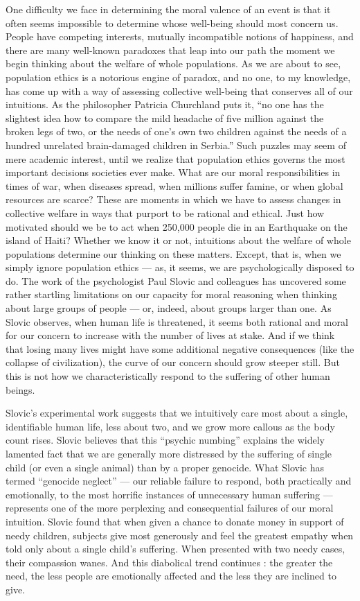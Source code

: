 \documentclass[a4paper,14pt]{extbook}
\begin{document}
One difficulty we face in determining the moral valence of an event is that it often seems impossible to determine whose well-being should most concern us.
People have competing interests, mutually incompatible notions of happiness, and there are many well-known paradoxes that leap into our path the moment we begin thinking about the welfare of whole populations.
As we are about to see, population ethics is a notorious engine of paradox, and no one, to my knowledge, has come up with a way of assessing collective well-being that conserves all of our intuitions.
As the philosopher Patricia Churchland puts it, ``no one has the slightest idea how to compare the mild headache of five million against the broken legs of two, or the needs of one's own two children against the needs of a hundred unrelated brain-damaged children in Serbia.''
Such puzzles may seem of mere academic interest, until we realize that population ethics governs the most important decisions societies ever make.
What are our moral responsibilities in times of war, when diseases spread, when millions suffer famine, or when global resources are scarce?
These are moments in which we have to assess changes in collective welfare in ways that purport to be rational and ethical.
Just how motivated should we be to act when 250,000 people die in an Earthquake on the island of Haiti?
Whether we know it or not, intuitions about the welfare of whole populations determine our thinking on these matters.
Except, that is, when we simply ignore population ethics --- as, it seems, we are psychologically disposed to do.
The work of the psychologist Paul Slovic and colleagues has uncovered some rather startling limitations on our capacity for moral reasoning when thinking about large groups of people --- or, indeed, about groups larger than one.
As Slovic observes, when human life is threatened, it seems both rational and moral for our concern to increase with the number of lives at stake.
And if we think that losing many lives might have some additional negative consequences (like the collapse of civilization), the curve of our concern should grow steeper still.
But this is not how we characteristically respond to the suffering of other human beings.

Slovic's experimental work suggests that we intuitively care most about a single, identifiable human life, less about two, and we grow more callous as the body count rises.
Slovic believes that this ``psychic numbing'' explains the widely lamented fact that we are generally more distressed by the suffering of single child (or even a single animal) than by a proper genocide.
What Slovic has termed ``genocide neglect'' --- our reliable failure to respond, both practically and emotionally, to the most horrific instances of unnecessary human suffering --- represents one of the more perplexing and consequential failures of our moral intuition.
Slovic found that when given a chance to donate money in support of needy children, subjects give most generously and feel the greatest empathy when told only about a single child's suffering.
When presented with two needy cases, their compassion wanes.
And this diabolical trend continues :
the greater the need, the less people are emotionally affected and the less they are inclined to give.
\end{document}
